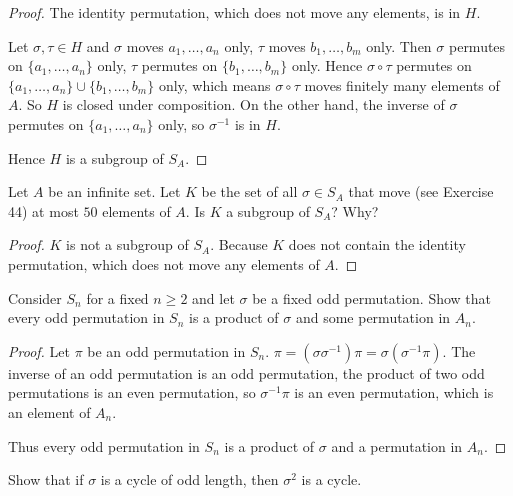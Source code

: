 \begin{proof}
    The identity permutation, which does not move any elements, is in $H$.

    Let $\sigma,\tau\in H$ and $\sigma$ moves $a_{1}, \ldots, a_{n}$ only, $\tau$ moves $b_{1}, \ldots, b_{m}$ only. Then $\sigma$ permutes on $\{ a_{1}, \ldots, a_{n} \}$ only, $\tau$ permutes on $\{ b_{1}, \ldots, b_{m} \}$ only. Hence $\sigma\circ\tau$ permutes on $\{ a_{1},\ldots, a_{n} \} \cup \{ b_{1}, \ldots, b_{m} \}$ only, which means $\sigma\circ\tau$ moves finitely many elements of $A$. So $H$ is closed under composition. On the other hand, the inverse of $\sigma$ permutes on $\{ a_{1}, \ldots, a_{n} \}$ only, so $\sigma^{-1}$ is in $H$.

    Hence $H$ is a subgroup of $S_{A}$.
\end{proof}

\newpage
\begin{exercise}
    Let $A$ be an infinite set. Let $K$ be the set of all $\sigma\in S_{A}$ that move (see Exercise 44) at most $50$ elements of $A$. Is $K$ a subgroup of $S_{A}$? Why?
\end{exercise}

\begin{proof}
    $K$ is not a subgroup of $S_{A}$. Because $K$ does not contain the identity permutation, which does not move any elements of $A$.
\end{proof}

\newpage
\begin{exercise}
    Consider $S_{n}$ for a fixed $n\geq 2$ and let $\sigma$ be a fixed odd permutation. Show that every odd permutation in $S_{n}$ is a product of $\sigma$ and some permutation in $A_{n}$.
\end{exercise}

\begin{proof}
    Let $\pi$ be an odd permutation in $S_{n}$. $\pi = (\sigma\sigma^{-1})\pi = \sigma(\sigma^{-1}\pi)$. The inverse of an odd permutation is an odd permutation, the product of two odd permutations is an even permutation, so $\sigma^{-1}\pi$ is an even permutation, which is an element of $A_{n}$.

    Thus every odd permutation in $S_{n}$ is a product of $\sigma$ and a permutation in $A_{n}$.
\end{proof}

\newpage
\begin{exercise}
    Show that if $\sigma$ is a cycle of odd length, then $\sigma^{2}$ is a cycle.
\end{exercise}

